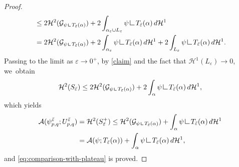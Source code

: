 \documentclass[JEP,XML,SOM,Unicode, NoFloatCountersInSection,published]{cedram}
\let\eps\varepsilon
\newcommand{\resa}{\mathop{\hbox{\vrule height 7pt width 0.5pt depth 0pt
\vrule height 0.5pt width 6pt depth 0pt}}\nolimits}
\newcommand{\resb}{\mathop{\hbox{\vrule height 4pt width 0.5pt depth 0pt
\vrule height 0.5pt width 3pt depth 0pt}}\nolimits}
\newcommand{\res}{\mathchoice{\resa}{\resa}{\resb}{\resb}}
\theoremstyle{definition}
\begin{document}
\begin{proof}
\begin{equation*}
\begin{split}
&\le 2\mathcal{H}^2(\mathcal{G}_{\psi\res T_{\bar\eps}(\alpha)}) +
2\int_{\alpha_\eps\cup L_\eps}\psi\res{T_{\bar\eps}(\alpha)}\, d\mathcal{H}^1\\
&= 2\mathcal{H}^2(\mathcal{G}_{\psi\res T_{\bar\eps}(\alpha)}) + 2\int_{\alpha_\eps}\psi\res{T_{\bar\eps}(\alpha)}\, d\mathcal{H}^1+
2\int_{ L_\eps}\psi\res{T_{\bar\eps}(\alpha)}\,d\mathcal{H}^1.
\end{split}
\end{equation*}
Passing to the limit as $\eps\to0^+$, by \eqref{claim} and the fact that $\mathcal{H}^1(L_\eps)\to0$, we~obtain
\begin{equation*}
\mathcal{H}^2(S_{\bar\eps})\le
2\mathcal{H}^2(\mathcal{G}_{\psi\res T_{\bar\eps}(\alpha)}) +
2\int_{\alpha}\psi\res{T_{\bar\eps}(\alpha)} \,d\mathcal{H}^1,
\end{equation*}
which yields
\begin{align*}
\mathcal{A}(\psi_{p,q}^{\bar\eps};U_{p,q}^{\bar\eps})&=
\mathcal{H}^2(S_{\bar\eps}^+)\le
\mathcal{H}^2(\mathcal{G}_{\psi\res T_{\bar\eps}(\alpha)}) +
\int_{\alpha}\psi\res{T_{\bar\eps}(\alpha)}\,d\mathcal{H}^1\\
&=\mathcal{A}(\psi; T_{\bar\eps}(\alpha))+
\int_{\alpha}\psi\res{T_{\bar\eps}(\alpha)}\,d\mathcal{H}^1,
\end{align*}
and \eqref{eq:comparison-with-plateau} is proved.


\end{proof}
\end{document}
